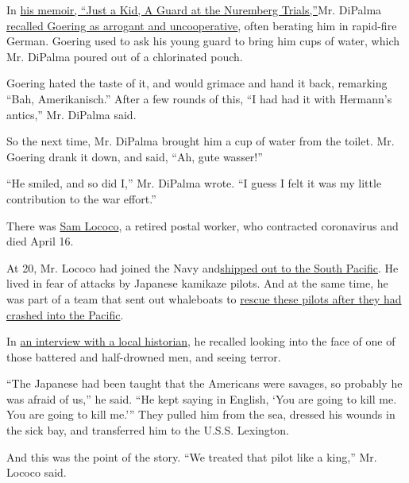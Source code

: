 In
\href{https://www.amazon.com/Just-Kid-Guard-Nuremberg-Trials-ebook/dp/B004HFRLJC}{his
memoir, ``Just a Kid, A Guard at the Nuremberg Trials,''}Mr. DiPalma
\href{https://www.witf.org/2020/05/22/remembering-her-father-a-wwii-veteran-who-stood-guard-at-the-nuremberg-trials/}{recalled
Goering as arrogant and uncooperative}, often berating him in rapid-fire
German. Goering used to ask his young guard to bring him cups of water,
which Mr. DiPalma poured out of a chlorinated pouch.

Goering hated the taste of it, and would grimace and hand it back,
remarking ``Bah, Amerikanisch.'' After a few rounds of this, ``I had had
it with Hermann's antics,'' Mr. DiPalma said.

So the next time, Mr. DiPalma brought him a cup of water from the
toilet. Mr. Goering drank it down, and said, ``Ah, gute wasser!''

``He smiled, and so did I,'' Mr. DiPalma wrote. ``I guess I felt it was
my little contribution to the war effort.''

There was
\href{https://www.legacy.com/obituaries/gazettenet/obituary.aspx?n=samuel-joseph-lococo\&pid=196051871\&fhid=15489}{Sam
Lococo}, a retired postal worker, who contracted coronavirus and died
April 16.

At 20, Mr. Lococo had joined the Navy
and\href{https://www.bostonherald.com/2020/04/20/final-salute-for-soldiers-home-vet-who-died-of-coronavirus/}{shipped
out to the South Pacific}. He lived in fear of attacks by Japanese
kamikaze pilots. And at the same time, he was part of a team that sent
out whaleboats to
\href{https://www.spokesman.com/stories/1995/jul/31/kamikaze-pilot-is-reunited-with-his-us-rescuers/}{rescue
these pilots after they had crashed into the Pacific}.

In
\href{https://forbeslibrary.org/store/product/touched-with-fire-an-american-community-in-world-war-ii/}{an
interview with a local historian}, he recalled looking into the face of
one of those battered and half-drowned men, and seeing terror.

``The Japanese had been taught that the Americans were savages, so
probably he was afraid of us,'' he said. ``He kept saying in English,
`You are going to kill me. You are going to kill me.''' They pulled him
from the sea, dressed his wounds in the sick bay, and transferred him to
the U.S.S. Lexington.

And this was the point of the story. ``We treated that pilot like a
king,'' Mr. Lococo said.

